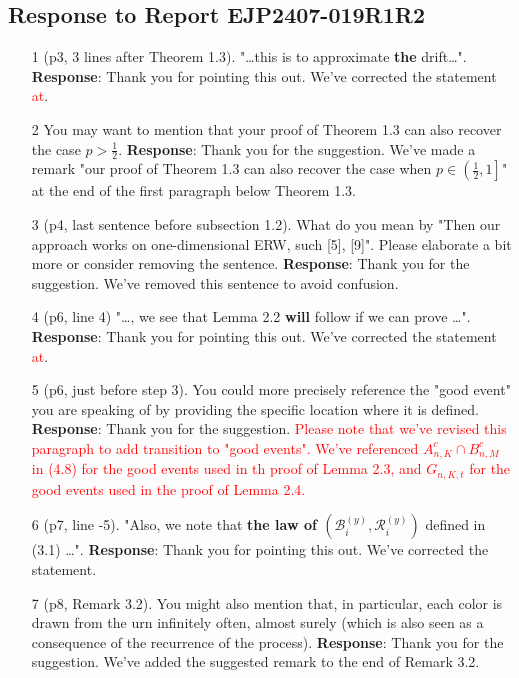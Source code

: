 \documentclass[11pt,a4paper]{article}
\numberwithin{equation}{section}
\def\TBF#1{\textcolor{red}{#1}} %
\begin{document}
	\subsection*{Response to Report EJP2407-019R1R2}
	\begin{itemize}
		\item[1] (p3, 3 lines after Theorem 1.3). "\dots this is to approximate \textbf{the} drift\dots".
		\subitem \textbf{Response}:  Thank you for pointing this out.  We've corrected the statement \TBF{at}.
		
		
		\item[2] You may want to mention that your proof of Theorem 1.3 can also recover the case $p > \frac{1}{2}$.
		\subitem \textbf{Response}:  Thank you for the suggestion. We've made a remark "our proof of Theorem 1.3 can also recover the case when $p \in \left(\frac{1}{2}, 1\right] $" at the end of the first paragraph below Theorem 1.3.
		
		
		\item[3] (p4, last sentence before subsection 1.2). What do you mean by "Then our approach works on one-dimensional ERW, such [5], [9]". Please elaborate a bit more or consider removing the sentence.
		\subitem \textbf{Response}: Thank you for the suggestion. We've removed this sentence to avoid confusion. 
		
		
		\item[4] (p6, line 4) "\dots , we see that Lemma 2.2 \textbf{will} follow if we can prove \dots".
		\subitem \textbf{Response}:  Thank you for pointing this out.  We've corrected the statement \TBF{at}.
		
		
		\item[5] (p6, just before step 3). You could more precisely reference the "good event" you are	speaking of by providing the specific location where it is defined.
		\subitem \textbf{Response}: Thank you for the suggestion. \TBF{Please note that we've revised this paragraph to add transition to "good events". We've referenced $A_{n,K}^c \cap B_{n,M}^c$ in (4.8) for the good events used in th proof of Lemma 2.3, and $G_{n,K,t}$ for the good events used in the proof of Lemma 2.4.}
		
		\item[6](p7, line -5). "Also, we note that \textbf{the law of $\left(\mathcal{B}_i^{(y)}
			,\mathcal{R}_i^{(y)} \right)$} defined in (3.1) \dots ".
		\subitem \textbf{Response}:  Thank you for pointing this out.  We've corrected the statement.
		
		
		\item[7] (p8, Remark 3.2). You might also mention that, in particular, each color is drawn from the
		urn infinitely often, almost surely (which is also seen as a consequence of the recurrence of
		the process).
		\subitem \textbf{Response}:  Thank you for the suggestion. We've added the suggested remark to the end of Remark 3.2.
		

\end{itemize}
\end{document}
